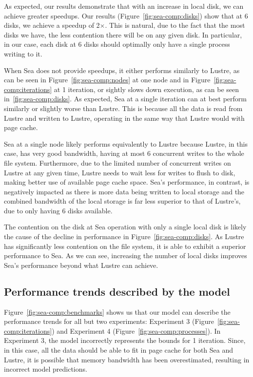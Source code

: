 \documentclass[10pt,journal,compsoc]{IEEEtran}
\begin{document}
      As expected, our results demonstrate that with an increase in local disk,
      we can achieve greater speedups. Our results
      (Figure~\ref{fig:sea-comp:disks}) show that at 6 disks, we achieve a
      speedup of 2$\times$. This is natural, due to the fact that the most disks
      we have, the less contention there will be on any given disk. In
      particular, in our case, each disk at 6 disks should optimally only have a
      single process writing to it.

      When Sea does not provide speedups, it either performs similarly to
      Lustre, as can be seen in Figure~\ref{fig:sea-comp:nodes} at one node and
      in Figure~\ref{fig:sea-comp:iterations} at 1 iteration, or sightly slows
      down execution, as can be seen in~\ref{fig:sea-comp:disks}. As expected,
      Sea at a single iteration can at best perform similarly or slightly worse
      than Lustre. This is because all the data is read from Lustre and written
      to Lustre, operating in the same way that Lustre would with page cache.

      Sea at a single node likely performs equivalently to Lustre because
      Lustre, in this case, has very good bandwidth, having at most 6 concurrent
      writes to the whole file system. Furthermore, due to the limited number of
      concurrent writes on Lustre at any given time, Lustre needs to wait less
      for writes to flush to disk, making better use of available page cache
      space. Sea's performance, in contrast, is negatively impacted as there is
      more data being written to local storage and the combined bandwidth of the
      local storage is far less superior to that of Lustre's, due to only having
      6 disks available.

      The contention on the disk at Sea operation with only a single local disk
      is likely the cause of the decline in performance in
      Figure~\ref{fig:sea-comp:disks}. As Lustre has significantly less
      contention on the file system, it is able to exhibit a superior
      performance to Sea. As we can see, increasing the number of local disks
      improves Sea's performance beyond what Lustre can achieve.
    

      \subsection{Performance trends described by the model}

      Figure~\ref{fig:sea-comp:benchmarks} shows us that our model can
      describe the performance trends for all but two experiments: Experiment 3
      (Figure~\ref{fig:sea-comp:iterations}) and Experiment 4
      (Figure~\ref{fig:sea-comp:processes}). In Experiment 3, the model
      incorrectly represents the bounds for 1 iteration. Since, in this case,
      all the data should be able to fit in page cache for both Sea and Lustre,
      it is possible that memory bandwidth has been overestimated, resulting in
      incorrect model predictions.
\end{document}

